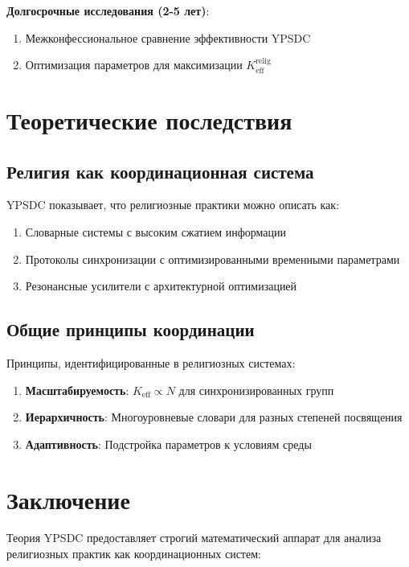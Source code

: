 \documentclass[12pt,a4paper]{article}
\begin{document}
	\textbf{Долгосрочные исследования (2-5 лет)}:
	\begin{enumerate}
		\item Межконфессиональное сравнение эффективности YPSDC
		\item Оптимизация параметров для максимизации $K_{\mathrm{eff}}^{\mathrm{relig}}$
	\end{enumerate}
	
	\section{Теоретические последствия}
	
	\subsection{Религия как координационная система}
	
	YPSDC показывает, что религиозные практики можно описать как:
	\begin{enumerate}
		\item Словарные системы с высоким сжатием информации
		\item Протоколы синхронизации с оптимизированными временными параметрами
		\item Резонансные усилители с архитектурной оптимизацией
	\end{enumerate}
	
	\subsection{Общие принципы координации}
	
	Принципы, идентифицированные в религиозных системах:
	\begin{enumerate}
		\item \textbf{Масштабируемость}: $K_{\mathrm{eff}} \propto N$ для синхронизированных групп
		\item \textbf{Иерархичность}: Многоуровневые словари для разных степеней посвящения
		\item \textbf{Адаптивность}: Подстройка параметров к условиям среды
	\end{enumerate}
	
	\section{Заключение}
	
	Теория YPSDC предоставляет строгий математический аппарат для анализа религиозных практик как координационных систем:
	
\end{document}
